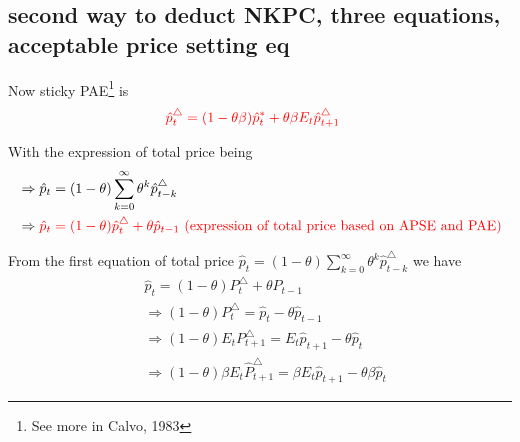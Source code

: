 \documentclass{article}
\begin{document}
\subsection{second way to deduct NKPC, three equations, acceptable price setting eq}

Now sticky PAE\footnote{See more in Calvo, 1983} is
\begin{align}
& \color{red} \hat p_t^\triangle=(1-\theta \beta) \hat p_t^* +\theta \beta E_t \hat p_{t+1}^\triangle
\end{align}

With the expression of total price being
\begin{align}
&\Rightarrow\hat p_t=(1-\theta) \sum\limits_{k=0}^\infty \theta^k \hat p_{t-k}^\triangle
\\&\Rightarrow \color{red} \hat p_t=(1-\theta)\hat p_t^\triangle +\theta \hat p_{t-1} \text{ (expression of total price based on APSE and PAE)}
\end{align}

From the first equation of total price $\hat p_t=(1-\theta) \sum\limits_{k=0}^\infty \theta^k \hat p_{t-k}^\triangle$ we have
\begin{align}
& \hat p_t =(1-\theta)P_t^\triangle+\theta P_{t-1}
\\& \Rightarrow (1-\theta)P_t^\triangle=\hat p_t - \theta \hat p_{t-1}
\\& \Rightarrow (1-\theta)E_t P_{t+1}^\triangle=E_t \hat p_{t+1} - \theta \hat p_t
\\& \Rightarrow (1-\theta)\beta E_t \hat P_{t+1}^\triangle=\beta E_t \hat p_{t+1} - \theta \beta \hat p_t
\end{align}
\end{document}
